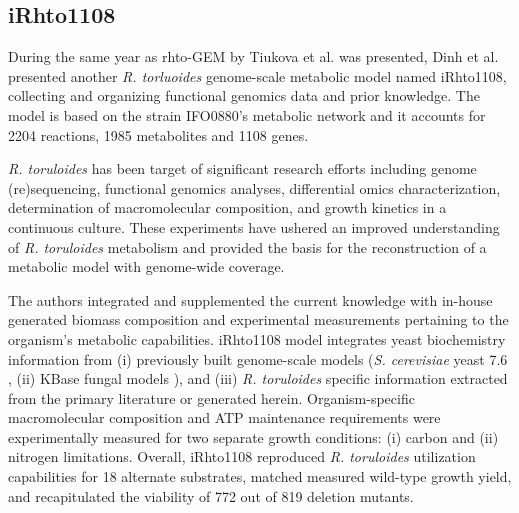 \subsection{iRhto1108}

During the same year as rhto-GEM by Tiukova et al. \cite{Tiukova2019} was presented, Dinh et al. \cite{Dinh2019} presented another \textit{R. torluoides} 
genome-scale metabolic model named iRhto1108, collecting and organizing functional genomics data
\cite{Coradetti2018} and prior knowledge. The model is based on the strain IFO0880's metabolic network and it accounts for 2204 reactions, 1985 metabolites and 1108 genes. 

\textit{R. toruloides} has been target of significant research efforts
including genome (re)sequencing, functional genomics analyses, differential omics characterization, determination of macromolecular composition, and growth
kinetics in a continuous culture. These experiments have ushered an improved understanding of \textit{R. toruloides}
metabolism and provided the basis for the reconstruction of a metabolic
model with genome-wide coverage. \cite{Dinh2019}

The authors integrated and supplemented the current knowledge with in-house generated biomass composition and experimental
measurements pertaining to the organism's metabolic capabilities. 
iRhto1108 model integrates yeast biochemistry information from (i) previously built genome-scale
models (\textit{S. cerevisiae} yeast 7.6 \cite{Aung2013}, (ii) KBase fungal
models \cite{Arkin2018}), and (iii) \textit{R. toruloides} specific information
extracted from the primary literature \cite{Coradetti2018}\cite{Jagtap2017}\cite{Kot2018} or generated herein. 
Organism-specific macromolecular composition and ATP maintenance requirements were experimentally measured for two separate growth conditions: (i) carbon and
(ii) nitrogen limitations. Overall, iRhto1108 reproduced \textit{R. toruloides} utilization capabilities for 18 alternate substrates, matched measured wild-type growth yield,
and recapitulated the viability of 772 out of 819 deletion mutants. \cite{Dinh2019}



